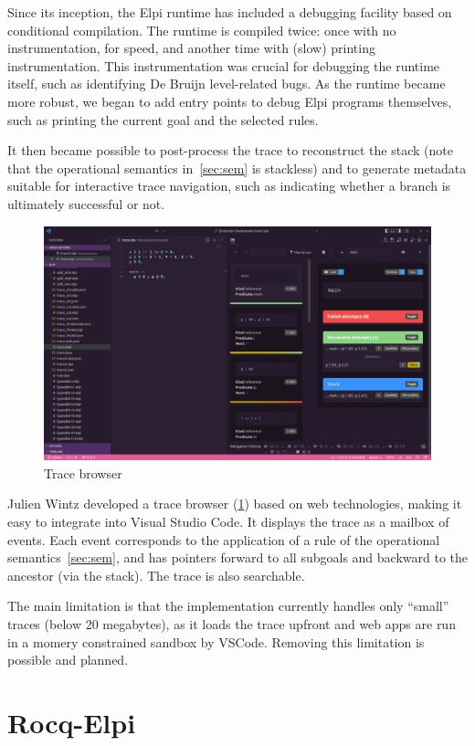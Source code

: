 \documentclass[a4paper, 11pt]{book}
\begin{document}
Since its inception, the Elpi runtime has included a debugging facility based
on conditional compilation. The runtime is compiled twice: once with
no instrumentation, for speed, and another time with (slow) printing
instrumentation. This instrumentation was crucial for debugging the runtime
itself, such as identifying De Bruijn level-related bugs. As the runtime
became more robust, we began to add entry points to debug Elpi programs
themselves, such as printing the current goal and the selected rules.

It then became possible to post-process the trace to reconstruct the
stack (note that the operational semantics in~\cref{sec:sem} is stackless)
and to generate metadata suitable for interactive trace navigation, such as
indicating whether a branch is ultimately successful or not.

\begin{figure}
    \includegraphics[width=.9\textwidth]{elpi-tracer}
    \caption{Trace browser\label{fig:trace}}
\end{figure}

Julien Wintz developed a trace browser (\cref{fig:trace}) based on web
technologies, making it easy to integrate into Visual Studio Code. It displays
the trace as a mailbox of events. Each event corresponds to the application of
a rule of the operational semantics~\cref{sec:sem}, and has pointers forward
to all subgoals and backward to the ancestor (via the stack). The trace is
also searchable.

The main limitation is that the implementation currently handles only
``small'' traces (below 20 megabytes), as it loads the trace upfront
and web apps are run in a momery constrained sandbox by VSCode.
Removing
this limitation is possible and planned.

\chapter{Rocq-Elpi}\label{sec:rocq}
\end{document}
